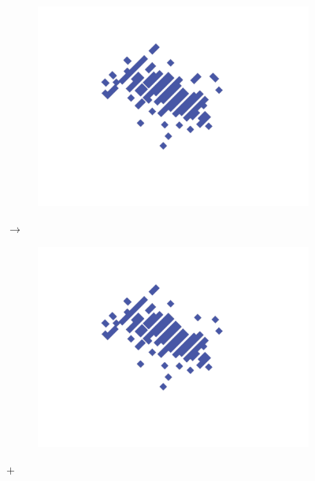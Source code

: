 \begin{figure}[tbph]
\centering
  \begin{subfigure}[c]{0.3\textwidth}
    \includegraphics[width=\textwidth]{photon/allPhoton2}
    \caption{}
    \label{fig:photonEvtDspPhotonFragAll}
  \end{subfigure}
  {\LARGE$\xrightarrow{}$}%
  \begin{subfigure}[c]{0.3\textwidth}
    \includegraphics[width=\textwidth]{photon/big2}
    \caption{}
    \label{fig:photonEvtDspPhotonFragBig}
  \end{subfigure}
   {\LARGE$+$}%
  \begin{subfigure}[c]{0.3\textwidth}

\end{subfigure}
\end{figure}

